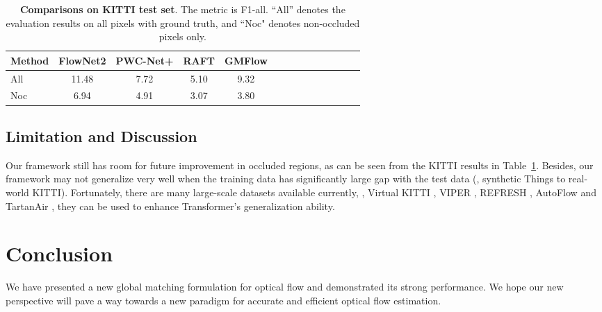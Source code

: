 \documentclass[10pt,twocolumn,letterpaper]{article}
\begin{document}
\begin{table}[t]
\footnotesize
    \centering
    \setlength{\tabcolsep}{3.pt} 

    \begin{tabular}{lccccccccccccc}
    \toprule
    
    
    Method & FlowNet2 \cite{ilg2017flownet} & PWC-Net+ \cite{sun2019models} & RAFT \cite{teed2020raft} & GMFlow \\
    
    \midrule
    
    All & 11.48 & 7.72 &  5.10 & 9.32 \\
    Noc & 6.94 & 4.91 & 3.07 & 3.80 \\

    \bottomrule
    \end{tabular}
    \vspace{-8pt}
    \caption{\textbf{Comparisons on KITTI test set}. The metric is F1-all. ``All'' denotes the evaluation results on all pixels with ground truth, and ``Noc" denotes non-occluded pixels only.}
    \label{tab:kitti_test_set}
    \vspace{-16pt}
\end{table}


\subsection{Limitation and Discussion}


Our framework still has room for future improvement in occluded regions, as can be seen from the KITTI results in Table~\ref{tab:kitti_test_set}.
Besides, our framework may not generalize very well when the training data has significantly large gap with the test data (\eg, synthetic Things to real-world KITTI). 
Fortunately, there are many large-scale datasets available currently, \eg, Virtual KITTI \cite{gaidon2016virtual,cabon2020virtual}, VIPER \cite{richter2017playing}, REFRESH \cite{lv2018learning}, AutoFlow \cite{sun2021autoflow} and TartanAir \cite{tartanair2020iros}, they can be used to enhance Transformer's generalization ability.








\section{Conclusion}

We have presented a new global matching formulation for optical flow and demonstrated its strong performance.
We hope our new perspective will pave a way towards a new paradigm for accurate and efficient optical flow estimation.
\end{document}
